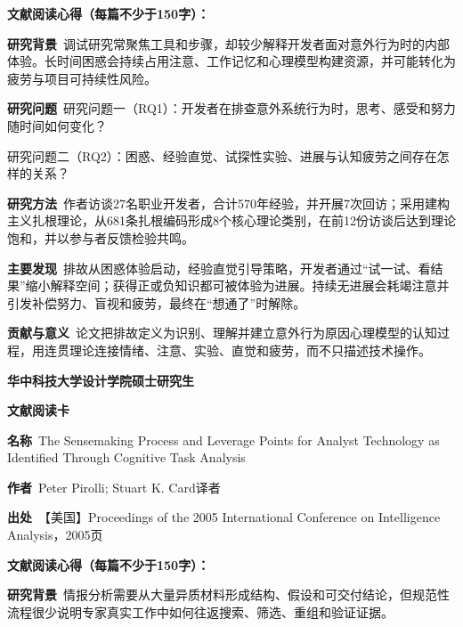 \vspace{0.35em}
\noindent\textbf{文献阅读心得（每篇不少于150字）：}\par
\noindent\textbf{研究背景}\ 调试研究常聚焦工具和步骤，却较少解释开发者面对意外行为时的内部体验。长时间困惑会持续占用注意、工作记忆和心理模型构建资源，并可能转化为疲劳与项目可持续性风险。\par
\noindent\textbf{研究问题}\ 研究问题一（RQ1）：开发者在排查意外系统行为时，思考、感受和努力随时间如何变化？\par
研究问题二（RQ2）：困惑、经验直觉、试探性实验、进展与认知疲劳之间存在怎样的关系？\par
\noindent\textbf{研究方法}\ 作者访谈27名职业开发者，合计570年经验，并开展7次回访；采用建构主义扎根理论，从681条扎根编码形成8个核心理论类别，在前12份访谈后达到理论饱和，并以参与者反馈检验共鸣。\par
\noindent\textbf{主要发现}\ 排故从困惑体验启动，经验直觉引导策略，开发者通过“试一试、看结果”缩小解释空间；获得正或负知识都可被体验为进展。持续无进展会耗竭注意并引发补偿努力、盲视和疲劳，最终在“想通了”时解除。\par
\noindent\textbf{贡献与意义}\ 论文把排故定义为识别、理解并建立意外行为原因心理模型的认知过程，用连贯理论连接情绪、注意、实验、直觉和疲劳，而不只描述技术操作。\par
\clearpage
\begin{center}
{\songti\bfseries\fontsize{18.5pt}{27.75pt}\selectfont 华中科技大学设计学院硕士研究生\par}
{\songti\bfseries\fontsize{18.5pt}{27.75pt}\selectfont 文献阅读卡\par}
\end{center}
\vspace{0.25em}
\noindent\underline{}\par
\vspace{0.35em}
\noindent\textbf{名称}\ The Sensemaking Process and Leverage Points for Analyst Technology as Identified Through Cognitive Task Analysis\par
\noindent\textbf{作者}\ Peter Pirolli; Stuart K. Card\quad 译者\par
\noindent\textbf{出处}\ 【美国】Proceedings of the 2005 International Conference on Intelligence Analysis，2005\quad 页\par
\vspace{0.35em}
\noindent\textbf{文献阅读心得（每篇不少于150字）：}\par
\noindent\textbf{研究背景}\ 情报分析需要从大量异质材料形成结构、假设和可交付结论，但规范性流程很少说明专家真实工作中如何往返搜索、筛选、重组和验证证据。\par
